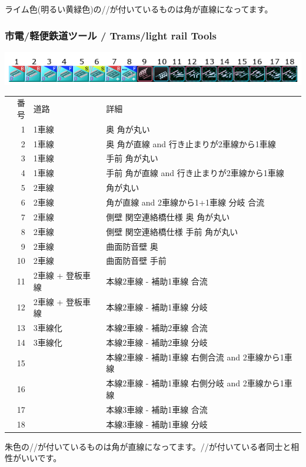 \documentclass{jarticle}
\begin{document}
\vspace{5pt}
ライム色(明るい黄緑色)の//が付いているものは角が直線になってます。

\newpage

\subsubsection*{市電/軽便鉄道ツール / Trams/light rail Tools}
\begin{flushleft}
  \includegraphics{picture/menu-2-1.png}
\end{flushleft}
\begin{tabular}{rll}
  番号 & 道路 & 詳細 \\
  1 & 1車線 & 奥 角が丸い \\
  2 & 1車線 & 奥 角が直線 and 行き止まりが2車線から1車線 \\
  3 & 1車線 & 手前 角が丸い \\
  4 & 1車線 & 手前 角が直線 and 行き止まりが2車線から1車線 \\
  5 & 2車線 & 角が丸い \\
  6 & 2車線 & 角が直線 and 2車線から1+1車線 分岐 合流 \\
  7 & 2車線 & 側壁 関空連絡橋仕様 奥 角が丸い \\
  8 & 2車線 & 側壁 関空連絡橋仕様 手前 角が丸い \\
  9 & 2車線 & 曲面防音壁 奥\\
  10 & 2車線 & 曲面防音壁 手前\\
  11 & 2車線 + 登板車線 & 本線2車線 - 補助1車線 合流\\
  12 & 2車線 + 登板車線 & 本線2車線 - 補助1車線 分岐\\
  13 & 3車線化 & 本線2車線 - 補助2車線 合流\\
  14 & 3車線化 & 本線2車線 - 補助2車線 分岐\\
  15 & & 本線2車線 - 補助1車線 右側合流 and 2車線から1車線\\
  16 & & 本線2車線 - 補助1車線 右側分岐 and 2車線から1車線\\
  17 & & 本線3車線 - 補助1車線 合流\\
  18 & & 本線3車線 - 補助1車線 分岐\\
\end{tabular}

\vspace{5pt}
朱色の//が付いているものは角が直線になってます。//が付いている者同士と相性がいいです。
\end{document}
